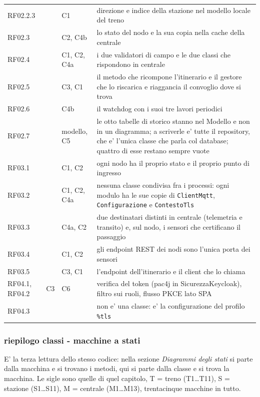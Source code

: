 \documentclass[11pt]{article}
\begin{document}
{\begin{longtable}{L{0.15\textwidth}L{0.14\textwidth}L{0.14\textwidth}L{0.44\textwidth}}
RF02.2.3 &  & C1 & direzione e indice della stazione nel modello locale del treno\\
RF02.3 &  & C2, C4b & lo stato del nodo e la sua copia nella cache della centrale\\
RF02.4 &  & C1, C2, C4a & i due validatori di campo e le due classi che rispondono in centrale\\
RF02.5 &  & C3, C1 & il metodo che ricompone l'itinerario e il gestore che lo riscarica e riaggancia il convoglio dove si trova\\
RF02.6 &  & C4b & il watchdog con i suoi tre lavori periodici\\
RF02.7 &  & modello, C5 & le otto tabelle di storico stanno nel Modello e non in un diagramma; a scriverle e' tutte il repository, che e' l'unica classe che parla col database; quattro di esse restano sempre vuote\\
RF03.1 &  & C1, C2 & ogni nodo ha il proprio stato e il proprio punto di ingresso\\
RF03.2 &  & C1, C2, C4a & nessuna classe condivisa fra i processi: ogni modulo ha le sue copie di \texttt{ClientMqtt}, \texttt{Configurazione} e \texttt{ContestoTls}\\
RF03.3 &  & C4a, C2 & due destinatari distinti in centrale (telemetria e transito) e, sul nodo, i sensori che certificano il passaggio\\
RF03.4 &  & C1, C2 & gli endpoint REST dei nodi sono l'unica porta dei sensori\\
RF03.5 &  & C3, C1 & l'endpoint dell'itinerario e il client che lo chiama\\
RF04.1, RF04.2 & C3 & C6 & verifica del token (pac4j in SicurezzaKeycloak), filtro sui ruoli, flusso PKCE lato SPA\\
RF04.3 &  &  & non e' una classe: e' la configurazione del profilo \texttt{\%tls}\\
\end{longtable}}
\subsubsection{riepilogo classi - macchine a stati}
\label{sec:orgf2da8ac}

E' la terza lettura dello stesso codice: nella sezione \emph{Diagrammi degli stati} si parte dalla macchina
e si trovano i metodi, qui si parte dalla classe e si trova la macchina. Le sigle sono quelle di quel
capitolo, T = treno (T1\ldots{}T11), S = stazione (S1\ldots{}S11), M = centrale (M1\ldots{}M13), trentacinque
macchine in tutto.
\end{document}
